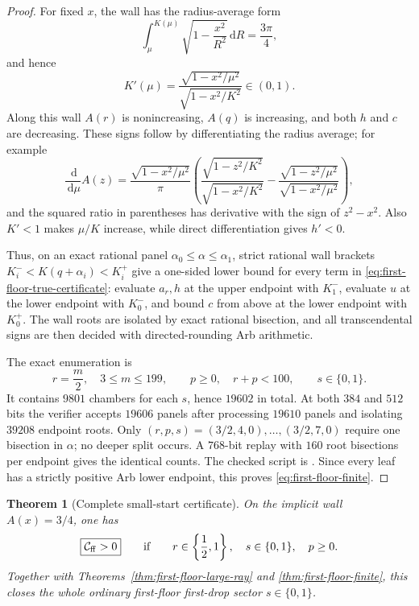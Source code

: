 \documentclass[11pt]{article}
\newtheorem{theorem}{Theorem}[section]
\theoremstyle{remark}
\newcommand{\dd}{\,\mathrm d}
\begin{document}
\begin{proof}
For fixed $x$, the wall has the radius-average form
\[
 \int_\mu^{K(\mu)}\sqrt{1-\frac{x^2}{R^2}}\dd R
 =\frac{3\pi}{4},
\]
and hence
\[
 K'(\mu)=
 \frac{\sqrt{1-x^2/\mu^2}}{\sqrt{1-x^2/K^2}}\in(0,1).
\]
Along this wall $A(r)$ is nonincreasing, $A(q)$ is increasing, and both
$h$ and $c$ are decreasing.  These signs follow by differentiating the
radius average; for example
\[
 \frac{\dd}{\dd\mu}A(z)
 =\frac{\sqrt{1-x^2/\mu^2}}\pi
 \left(
 \frac{\sqrt{1-z^2/K^2}}{\sqrt{1-x^2/K^2}}
 -\frac{\sqrt{1-z^2/\mu^2}}{\sqrt{1-x^2/\mu^2}}
 \right),
\]
and the squared ratio in parentheses has derivative with the sign of
$z^2-x^2$.  Also $K'<1$ makes $\mu/K$ increase, while direct
differentiation gives $h'<0$.

Thus, on an exact rational panel
$\alpha_0\leq\alpha\leq\alpha_1$, strict rational wall brackets
$K_i^-<K(q+\alpha_i)<K_i^+$ give a one-sided lower bound for every term
in \eqref{eq:first-floor-true-certificate}: evaluate $a_r,h$ at the
upper endpoint with $K_1^-$, evaluate $u$ at the lower endpoint with
$K_0^-$, and bound $c$ from above at the lower endpoint with $K_0^+$.
The wall roots are isolated by exact rational bisection, and all
transcendental signs are then decided with directed-rounding Arb
arithmetic.

The exact enumeration is
\[
 r=\frac m2,\quad3\leq m\leq199,\qquad
 p\geq0,\quad r+p<100,\qquad s\in\{0,1\}.
\]
It contains $9801$ chambers for each $s$, hence $19602$ in total.
At both $384$ and $512$ bits the verifier accepts $19606$ panels after
processing $19610$ panels and isolating $39208$ endpoint roots.  Only
$(r,p,s)=(3/2,4,0),\ldots,(3/2,7,0)$ require one bisection in $\alpha$;
no deeper split occurs.  A $768$-bit replay with $160$ root bisections per
endpoint gives the identical counts.  The checked script is
.  Since every leaf
has a strictly positive Arb lower endpoint, this proves
\eqref{eq:first-floor-finite}.
\end{proof}

\begin{theorem}[Complete small-start certificate]
\label{thm:first-floor-small-starts}
On the implicit wall $A(x)=3/4$, one has
\begin{equation}
 \boxed{\mathcal C_{\rm ff}>0}
 \qquad\text{if}\qquad
 r\in\left\{\frac12,1\right\},\quad
 s\in\{0,1\},\quad p\geq0.
 \label{eq:first-floor-small-starts}
\end{equation}
Together with Theorems~\ref{thm:first-floor-large-ray} and
\ref{thm:first-floor-finite}, this closes the whole ordinary first-floor
first-drop sector $s\in\{0,1\}$.
\end{theorem}
\end{document}
